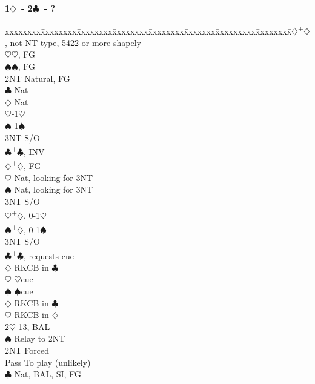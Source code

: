 \documentclass[10pt]{article}
\renewcommand{\c}{$\clubsuit$}
\renewcommand{\d}{$\diamondsuit$}
\newcommand{\h}{$\heartsuit$}
\newcommand{\s}{$\spadesuit$}
\newcommand{\p}{\textsuperscript{+}}
\newenvironment{bidtable}[1][]
{\textbf{#1}
  \begin{adjustwidth}{1em}{}
    \addvspace{2pt}
    \begin{tabbing}
      xxxxxxxx\=xxxxxxxx\=xxxxxxxx\=xxxxxxxx\=xxxxxxxx\=xxxxxxx\=xxxxxxxxx\=xxxxxxxx\=\kill}
{\end{tabbing}\end{adjustwidth}\bigskip}%
\begin{document}
\begin{bidtable}[1\d\ - 2\c\ - ?]
2\d {}\p\d, not NT type, 5422 or more shapely  \\
    \h {}\h, FG                            \\
    \s {}\s, FG                            \\
    \> 2NT \> Natural, FG                        \\
    \>     \c \> Nat                         \\
    \>     \d \> Nat                         \\
    \>     \h {}-1\h                       \\
    \>     \s {}-1\s                       \\
    \>     \> 3NT \> S/O                         \\
    \c {}\p\c, INV                         \\
    \d {}\p\d, FG                          \\
    \>     \h \> Nat, looking for 3NT        \\
    \>     \s \> Nat, looking for 3NT        \\
    \>     \> 3NT \> S/O                         \\
    \h {}\p\d, 0-1\h                       \\
    \s {}\p\d, 0-1\s                       \\
    \> 3NT \> S/O                                \\
    \c {}\p\c, requests cue                \\
    \>     \d \> RKCB in \c                  \\
    \>     \h \> \h cue                      \\
    \>     \s \> \s cue                      \\
    \d \> RKCB in \c                         \\
    \h \> RKCB in \d                         \\
2\h {}-13, BAL                                \\
    \s \> Relay to 2NT                       \\
    \>     \> 2NT \> Forced                      \\
    \>     \>     \> Pass \> To play (unlikely)  \\
    \>     \>     \c  \> Nat, BAL, SI, FG    \\

\end{bidtable}
\end{document}
